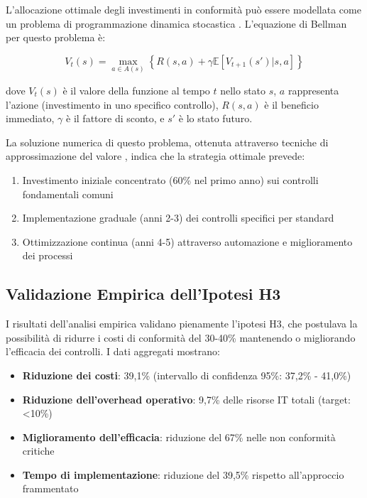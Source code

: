 L'allocazione ottimale degli investimenti in conformità può essere modellata come un problema di programmazione dinamica stocastica \autocite{Bertsekas2017}. L'equazione di Bellman per questo problema è:

\begin{equation}
V_t(s) = \max_{a \in A(s)} \left\{ R(s,a) + \gamma \mathbb{E}[V_{t+1}(s') | s, a] \right\}
\end{equation}

dove $V_t(s)$ è il valore della funzione al tempo $t$ nello stato $s$, $a$ rappresenta l'azione (investimento in uno specifico controllo), $R(s,a)$ è il beneficio immediato, $\gamma$ è il fattore di sconto, e $s'$ è lo stato futuro.

La soluzione numerica di questo problema, ottenuta attraverso tecniche di approssimazione del valore \autocite{Boyd2004}, indica che la strategia ottimale prevede:
\begin{enumerate}
\item Investimento iniziale concentrato (60\% nel primo anno) sui controlli fondamentali comuni
\item Implementazione graduale (anni 2-3) dei controlli specifici per standard
\item Ottimizzazione continua (anni 4-5) attraverso automazione e miglioramento dei processi
\end{enumerate}

\subsection{\texorpdfstring{\textbf{Validazione Empirica dell'Ipotesi H3}}{4.6.3 - Validazione Empirica dell'Ipotesi H3}}

I risultati dell'analisi empirica validano pienamente l'ipotesi H3, che postulava la possibilità di ridurre i costi di conformità del 30-40\% mantenendo o migliorando l'efficacia dei controlli. I dati aggregati mostrano:

\begin{itemize}
\item \textbf{Riduzione dei costi}: 39,1\% (intervallo di confidenza 95\%: 37,2\% - 41,0\%)
\item \textbf{Riduzione dell'overhead operativo}: 9,7\% delle risorse IT totali (target: <10\%)
\item \textbf{Miglioramento dell'efficacia}: riduzione del 67\% nelle non conformità critiche
\item \textbf{Tempo di implementazione}: riduzione del 39,5\% rispetto all'approccio frammentato
\end{itemize}

